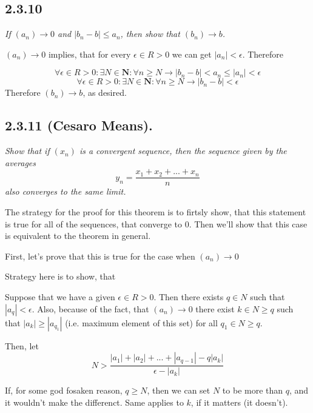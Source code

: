 \documentclass[11pt,oneside,titlepage]{book}
\begin{document}
\subsection*{2.3.10}
\textit{If $(a_n) \to 0$ and $|b_n - b| \leq a_n$, then show that $(b_n) \to b$.}

$(a_n) \to 0$ implies, that for every $\epsilon \in R > 0$ we can get
$|a_n| < \epsilon$. Therefore

$$\forall \epsilon \in R > 0: \exists N \in \textbf{N}: \forall n \geq N \to
|b_n - b| < a_n \leq |a_n| < \epsilon$$
$$\forall \epsilon \in R > 0: \exists N \in \textbf{N}: \forall n \geq N \to
|b_n - b|  < \epsilon$$
Therefore $(b_n) \to b$, as desired.

\subsection*{2.3.11 (Cesaro Means).}
\textit{Show that if $(x_n)$ is a convergent sequence, then the sequence given by
  the averages }
$$y_n = \frac{x_1 + x_2 + ... + x_n}{n}$$
\textit{also converges to the same limit.}

The strategy for the proof for this theorem  is to firtsly show, that this
statement is true for all of the sequences, that converge to
0. Then we'll show that this case is equivalent to the theorem in general.

First, let's prove that this is true for the case when  $(a_n) \to 0$

Strategy here is to show, that 

Suppose that we have a given $\epsilon \in R > 0$. Then there exists
$q \in N$ such that  $|a_q| < \epsilon$. Also, because of the fact,
that $(a_n) \to 0$ there exist  $ k \in N \geq q$
such that $|a_k| \geq |a_{q_1}|$ (i.e. maximum element of this set)
for all $q_1 \in N \geq q$.

Then, let
$$ N > \frac{|a_1| + |a_2| +  ... + |a_{q - 1}| - q|a_k|}{\epsilon -   |a_k|}$$

If, for some god fosaken reason, $q \geq N$, then we can set $N$ to be more
than $q$, and it wouldn't make the differenct. Same applies to $k$, if it
matters (it doesn't).
\end{document}
